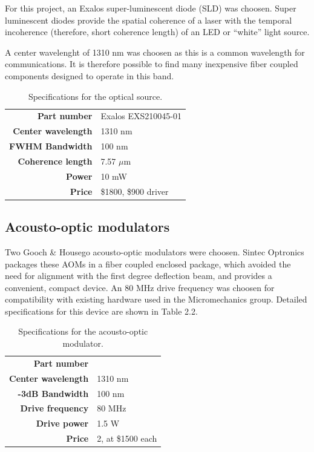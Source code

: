 For this project,  an Exalos super-luminescent diode (SLD) was choosen. Super luminescent diodes provide the spatial coherence of a laser with the temporal incoherence (therefore, short coherence length) of an LED or ``white'' light source.

A center wavelenght of 1310 nm was choosen as this is a common wavelength for communications. It is therefore possible to find many inexpensive fiber coupled components designed to operate in this band.

\begin{table}[h!]
\centering
\begin{tabular}{ >{\bf}r | l}
Part number & Exalos EXS210045-01 \\
Center wavelength & 1310 nm \\
FWHM Bandwidth & 100 nm \\
Coherence length & 7.57 $\mu$m \\
Power & 10 mW \\
Price & \$1800, \$900 driver \\
\end{tabular}
\caption{Specifications for the optical source.}
\end{table} 

\subsection{Acousto-optic modulators}

Two Gooch \& Housego acousto-optic modulators were choosen. Sintec Optronics packages these AOMs in a fiber coupled enclosed package, which avoided the need for alignment with the first degree deflection beam, and provides a convenient, compact device. An 80 MHz drive frequency was choosen for compatibility with existing hardware used in the Micromechanics group. Detailed specifications for this device are shown in Table 2.2.

\begin{table}[h!]
\centering
\begin{tabular}{ >{\bf}r | l}
Part number & \\
Center wavelength & 1310 nm \\
-3dB Bandwidth & 100 nm \\
Drive frequency & 80 MHz \\
Drive power & 1.5 W \\
Price & 2, at \$1500 each \\
\end{tabular}
\caption{Specifications for the acousto-optic modulator.}
\end{table} 

